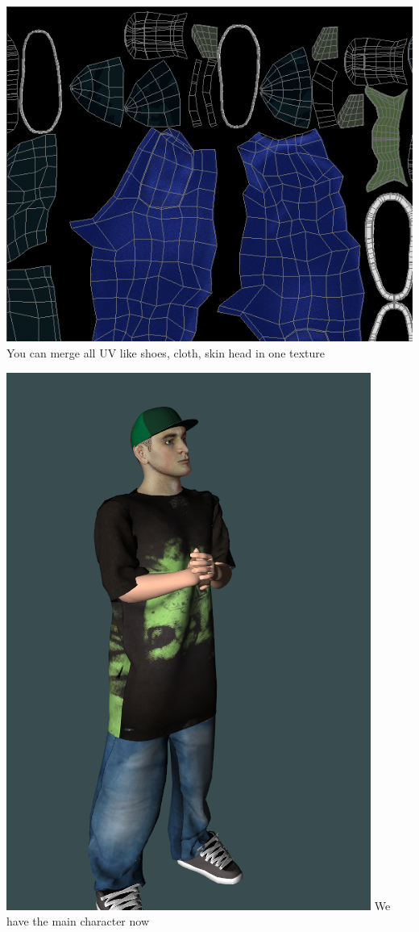 \documentclass{article}
\begin{document}
  \includegraphics[width=\textwidth]{35.png}
  You can merge all UV like shoes, cloth, skin head in one texture

  \includegraphics[width=\textwidth]{9.png}
  We have the main character now
  
\end{document}

